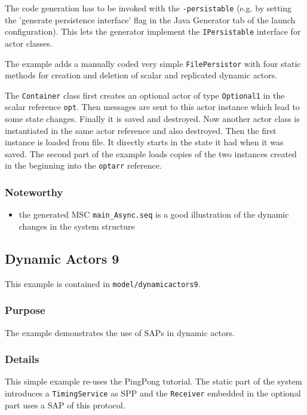 The code generation has to be invoked with the \texttt{-persistable} (e.g. by setting the 'generate persistence interface' flag in the Java Generator tab
of the launch configuration). This lets the generator implement the \texttt{IPersistable} interface for actor classes.

The example adds a manually coded very simple \texttt{FilePersistor} with four static methods for creation and deletion of scalar and replicated
dynamic actors.

The \texttt{Container} class first creates an optional actor of type \texttt{Optional1} in the scalar reference \texttt{opt}.
Then messages are sent to this actor instance which lead to some state changes. Finally it is saved and destroyed.
Now another actor class is instantiated in the same actor reference and also destroyed. Then the first instance is loaded from file.
It directly starts in the state it had when it was saved. The second part of the example loads copies of the two
instances created in the beginning into the \texttt{optarr} reference.

\subsubsection{Noteworthy}

\begin{itemize}
\item the generated MSC \texttt{main\_Async.seq} is a good illustration of the dynamic changes in the system structure
\end{itemize}

\subsection{Dynamic Actors 9}

This example is contained in \texttt{model/dynamicactors9}.

\subsubsection{Purpose}

The example demonstrates the use of SAPs in dynamic actors.

\subsubsection{Details}

This simple example re-uses the PingPong tutorial. The static part of the system introduces a \texttt{TimingService} as SPP
and the \texttt{Receiver} embedded in the optional part uses a SAP of this protocol.

